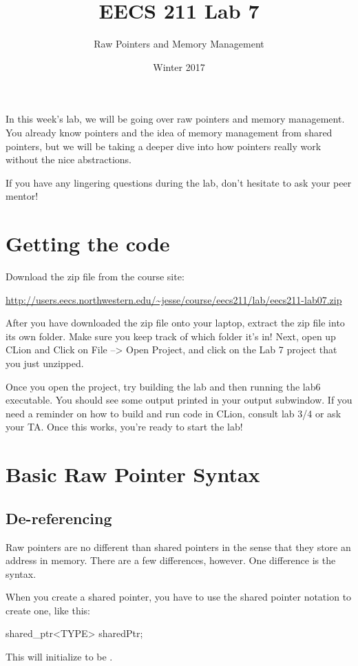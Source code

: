 \documentclass{tufte-handout}
\title{EECS 211 Lab 7}
\author{Raw Pointers and Memory Management}
\date{Winter 2017}
\begin{document}
\maketitle

In this week's lab, we will be going over raw pointers and memory management.
You already know pointers and the idea of memory management from shared pointers, but we will be taking a deeper dive into how pointers really work without the nice abstractions.

If you have any lingering questions during the lab, don't hesitate to ask your peer mentor!
\section{Getting the code}
Download the zip file from the course site: \medskip

\url{http://users.eecs.northwestern.edu/~jesse/course/eecs211/lab/eecs211-lab07.zip}

\medskip \noindent
After you have downloaded the zip file onto your laptop, extract the zip file into its own folder. Make sure you keep track of which folder it's in!  Next, open up CLion and Click on File --> Open Project, and click on the Lab 7 project that you just unzipped. 

Once you open the project, try building the lab and then running the lab6 executable. 
You should see some output printed in your output subwindow.
If you need a reminder on how to build and run code in CLion, consult lab 3/4 or ask your TA.
Once this works, you're ready to start the lab!

\section{Basic Raw Pointer Syntax}

\subsection {De-referencing}
Raw pointers are no different than shared pointers in the sense that they store an address in memory.
There are a few differences, however.
One difference is the syntax.

When you create a shared pointer, you have to use the shared pointer notation to create one, like this:
\begin{Code}
    shared_ptr<TYPE> sharedPtr;
\end{Code}
This will initialize  to be .
\end{document}
